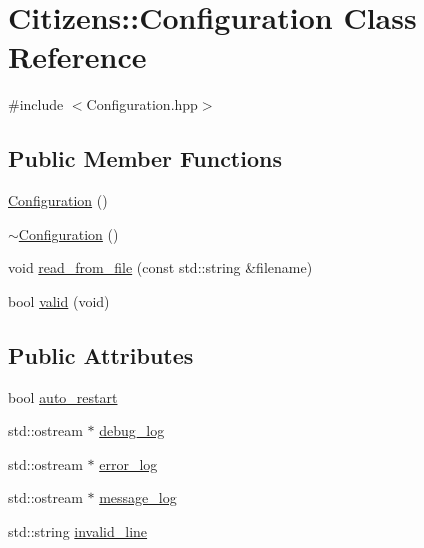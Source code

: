 \hypertarget{classCitizens_1_1Configuration}{
\section{Citizens::Configuration Class Reference}
\label{classCitizens_1_1Configuration}
}


{\ttfamily \#include $<$Configuration.hpp$>$}

\subsection*{Public Member Functions}
\begin{DoxyCompactItemize}
\item 
\hyperlink{classCitizens_1_1Configuration_a779947337bf652f0e773cb29f37f14ba}{Configuration} ()
\item 
\hyperlink{classCitizens_1_1Configuration_a0dd0fa189e239f4c9a036303f641441e}{$\sim$Configuration} ()
\item 
void \hyperlink{classCitizens_1_1Configuration_a6085700f2d6c73ec39f7ae205df1e642}{read\_\-from\_\-file} (const std::string \&filename)
\item 
bool \hyperlink{classCitizens_1_1Configuration_a6e1a3d2bf186b749c13657e53a376edf}{valid} (void)
\end{DoxyCompactItemize}
\subsection*{Public Attributes}
\begin{DoxyCompactItemize}
\item 
bool \hyperlink{classCitizens_1_1Configuration_a3e3ead7e89de896b5342c840b34a57a9}{auto\_\-restart}
\item 
std::ostream $\ast$ \hyperlink{classCitizens_1_1Configuration_a27a379adf36564b1cdc6b23bedd71971}{debug\_\-log}
\item 
std::ostream $\ast$ \hyperlink{classCitizens_1_1Configuration_aa00c45295d6fafe89d5150fbf6b2b25c}{error\_\-log}
\item 
std::ostream $\ast$ \hyperlink{classCitizens_1_1Configuration_a13ad78a40156fcf84329207d05ee020d}{message\_\-log}
\item 
std::string \hyperlink{classCitizens_1_1Configuration_aa4c8d99ae259f5bf955bd0e7dd826806}{invalid\_\-line}
\end{DoxyCompactItemize}


